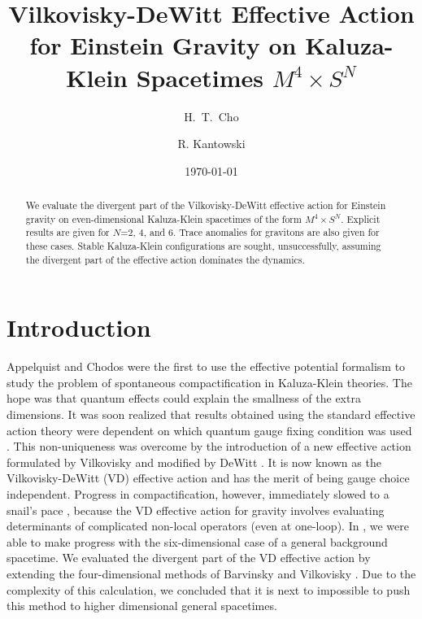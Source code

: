 \documentclass[a4paper,aps,preprint,groupedaddress,showpacs]{revtex4}
\begin{document}




\title{Vilkovisky-DeWitt Effective Action for Einstein Gravity
on Kaluza-Klein Spacetimes $M^{4}\times S^{N}$}

\author{H.~T.~Cho}

\author{R. Kantowski}
\date{\today}
\begin{abstract}

We evaluate the divergent part of the Vilkovisky-DeWitt
effective action for Einstein gravity on even-dimensional Kaluza-Klein
spacetimes of the form $M^{4}\times S^{N}$. 
Explicit results are given for $N$=2, 4, and 6.
Trace anomalies for gravitons are
also given for these cases.
Stable  Kaluza-Klein configurations are sought, unsuccessfully,  assuming 
the divergent part of the effective action dominates the dynamics.
\end{abstract}
\pacs{}
\maketitle
\newpage

\section{Introduction}


Appelquist and Chodos \cite{AC} were the first to use the effective potential formalism 
to study the  problem of spontaneous
compactification in Kaluza-Klein theories. 
The  hope was that  quantum effects could
explain the smallness of the extra dimensions. It was soon realized that 
results obtained using the standard effective action theory were dependent 
on which quantum gauge fixing condition was used
\cite{RDS,KL}. This non-uniqueness was overcome \cite{BO,HKLT}
by the introduction of a new
effective action formulated by Vilkovisky \cite{GV} and modified by
DeWitt \cite{BD1}. It is now known as the 
Vilkovisky-DeWitt (VD) effective action and has the merit of being 
gauge choice independent. 
Progress in compactification, however,  immediately slowed to a snail's pace 
\cite{BLO,SDOb,BKLM,BKO,BO1,BDO,TV,SDO}, 
because the VD effective
action for gravity involves evaluating determinants of complicated
non-local operators (even at one-loop). In \cite{CK1}, we were able to make 
progress with the 
six-dimensional case of a general background spacetime. We evaluated the 
divergent part
of the VD effective action by extending the four-dimensional
methods of Barvinsky and Vilkovisky \cite{BV}. Due to the complexity of this calculation,
we concluded that it is next to impossible to push this method to higher dimensional
general spacetimes.
\end{document}
